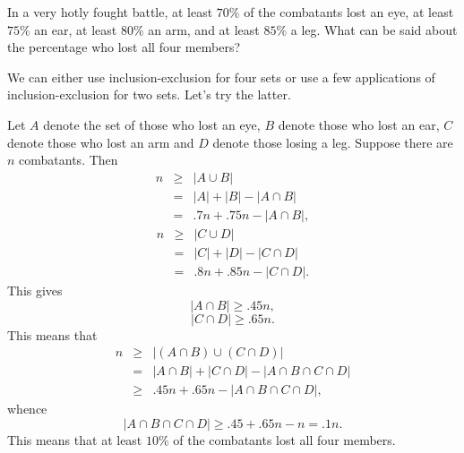 \begin{exer}
In a very hotly fought battle, at least $70\%$ of the combatants
lost an eye, at least $75\%$ an ear, at least $80\%$ an arm, and at
least $85\%$ a leg. What can be said about the percentage who lost
all four members? 
\vspace*{3.5in}
\begin{answer} 
We can either use inclusion-exclusion for four sets or use a few applications
of inclusion-exclusion for two sets.  Let's try the latter.

Let $A$ denote the set of
those who lost an eye, $B$ denote those who lost an ear, $C$ denote
those who lost an arm and $D$ denote those losing a leg. Suppose
there are $n$ combatants.
 Then
$$\begin{array}{lll}
n & \geq & | A \cup B| \\ & = &  | A| + | B| - | A \cap B| \\ & = & .7n + .75n - | A\cap B|, 
\end{array}$$
$$\begin{array}{lll}
n  &\geq & | C \cup D| \\ & = & | C| + | D| - | C \cap D| \\ & = & .8n + .85n - |C\cap D|. 
\end{array}$$
This gives
$$| A \cap B| \geq .45n,$$
$$| C \cap D| \geq .65n.$$This means that
$$\begin{array}{lll}n &\geq & | (A\cap B) \cup (C \cap D)| \\ & = & | A \cap B| + | C \cap D| - | A \cap B \cap C \cap D|\\
& \geq &  .45n + .65n - | A \cap B \cap C \cap D|,\end{array}$$
whence
$$| A \cap B \cap C \cap D| \geq .45 + .65n - n = .1n.$$This means
that at least $10\%$ of the combatants lost all four members.
\end{answer}
\end{exer}

